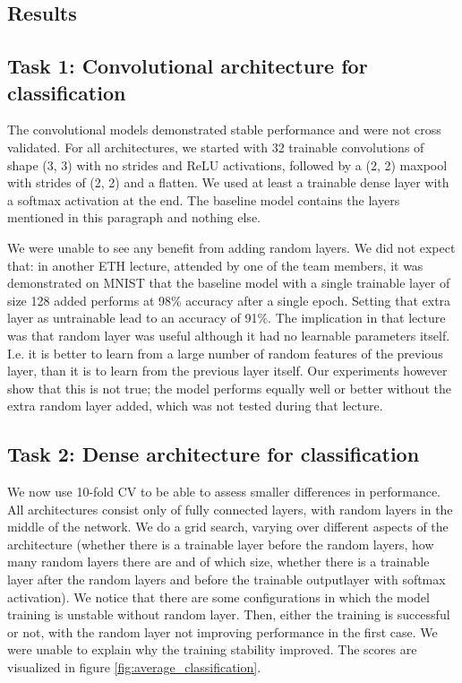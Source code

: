\documentclass[]{article}
\begin{document}
\begin{multicols}{2}
	\section{Results}
	\subsection*{Task 1: Convolutional architecture for classification}
	The convolutional models demonstrated stable performance and were not cross validated. For all architectures, we started with 32 trainable convolutions of shape (3, 3) with no strides and ReLU activations, followed by a (2, 2) maxpool with strides of (2, 2) and a flatten. We used at least a trainable dense layer with a softmax activation at the end. The baseline model contains the layers mentioned in this paragraph and nothing else.
	
	We were unable to see any benefit from adding random layers. We did not expect that: in another ETH lecture, attended by one of the team members, it was demonstrated on MNIST that the baseline model with a single trainable layer of size 128 added performs at 98\% accuracy after a single epoch. Setting that extra layer as untrainable lead to an accuracy of 91\%. The implication in that lecture was that random layer was useful although it had no learnable parameters itself. I.e. it is better to learn from a large number of random features of the previous layer, than it is to learn from the previous layer itself. Our experiments however show that this is not true; the model performs equally well or better without the extra random layer added, which was not tested during that lecture.
	
	\subsection*{Task 2: Dense architecture for classification}
	We now use 10-fold CV to be able to assess smaller differences in performance. All architectures consist only of fully connected layers, with random layers in the middle of the network. We do a grid search, varying over different aspects of the architecture (whether there is a trainable layer before the random layers, how many random layers there are and of which size, whether there is a trainable layer after the random layers and before the trainable outputlayer with softmax activation). We notice that there are some configurations in which the model training is unstable without random layer. Then, either the training is successful or not, with the random layer not improving performance in the first case. We were unable to explain why the training stability improved. The scores are visualized in figure \ref{fig:average_classification}.
	

\end{multicols}
\end{document}
